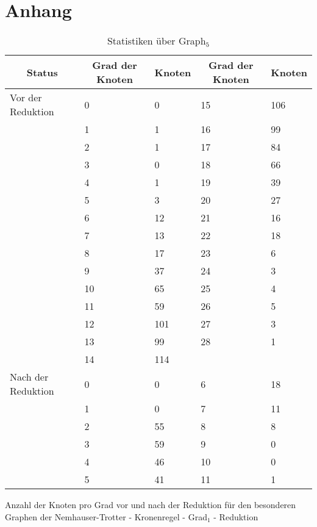 \chapter{Anhang}
\label{ch:Anhang}

\begin{table}[htb]
\caption{Statistiken über Graph$_{5}$\label{tab:graph4}}
\vspace*{1em}
\centering

\bgroup
\def\arraystretch{1.3}%

\begin{threeparttable}

\begin{tabular}[c]{ l  l  l | l  l}
	\hline
	\multicolumn{1}{c}{\textbf{Status}} & 
	\multicolumn{1}{c}{\textbf{Grad der Knoten}} & 
	\multicolumn{1}{c|}{\textbf{Knoten}} &
	\multicolumn{1}{c}{\textbf{Grad der Knoten}} & 
	\multicolumn{1}{c}{\textbf{Knoten}}\\
	
	\hline
		
	Vor der Reduktion & 0 & 0 &15  & 106 \\
	& 1 & 1 & 16&99 \\
	& 2 & 1 & 17& 84\\
	& 3 & 0 & 18& 66\\
	& 4 & 1 & 19& 39\\
	& 5 & 3 & 20& 27\\
	& 6 & 12 & 21& 16\\
	& 7 & 13 & 22& 18\\
	&  8& 17 & 23& 6\\
	&  9& 37 & 24& 3\\
	&  10& 65 & 25& 4\\
	&  11& 59 & 26& 5\\
	&  12& 101 & 27& 3\\
	&  13& 99 & 28& 1\\
	&  14& 114 & & \\
	
	\hline

	Nach der Reduktion & 0 & 0 & 6 & 18 \\
	& 1 & 0 & 7 & 11 \\
	& 2 & 55 & 8 & 8 \\
	& 3 & 59 & 9 & 0 \\
	& 4 & 46 & 10 & 0 \\
	& 5 & 41 & 11 & 1 \\
	
	\hline
	
\end{tabular}
\begin{tablenotes}\footnotesize
\item  Anzahl der Knoten pro Grad vor und nach der Reduktion für den besonderen Graphen der Nemhauser-Trotter - Kronenregel - Grad$_{1}$ - Reduktion
\end{tablenotes}

\end{threeparttable}

\egroup

\end{table}

